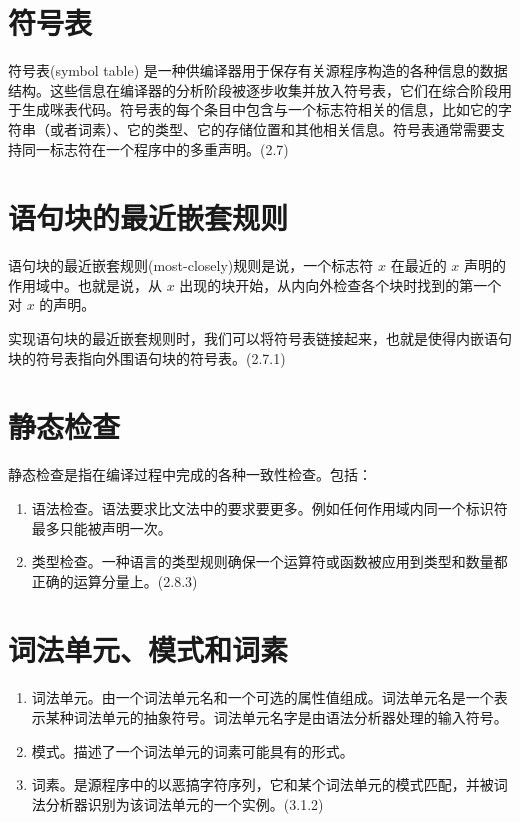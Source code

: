 \documentclass[12pt]{article}
\begin{document}
\section*{符号表}

符号表(symbol table) 是一种供编译器用于保存有关源程序构造的各种信息的数据结构。这些信息在编译器的分析阶段被逐步收集并放入符号表，它们在综合阶段用于生成咪表代码。符号表的每个条目中包含与一个标志符相关的信息，比如它的字符串（或者词素）、它的类型、它的存储位置和其他相关信息。符号表通常需要支持同一标志符在一个程序中的多重声明。(2.7)


\section*{语句块的最近嵌套规则}

语句块的最近嵌套规则(most-closely)规则是说，一个标志符 $x$ 在最近的 $x$ 声明的作用域中。也就是说，从 $x$ 出现的块开始，从内向外检查各个块时找到的第一个对 $x$ 的声明。

实现语句块的最近嵌套规则时，我们可以将符号表链接起来，也就是使得内嵌语句块的符号表指向外围语句块的符号表。(2.7.1)

\section*{静态检查}

静态检查是指在编译过程中完成的各种一致性检查。包括：
\begin{enumerate}
\item 语法检查。语法要求比文法中的要求要更多。例如任何作用域内同一个标识符最多只能被声明一次。
\item 类型检查。一种语言的类型规则确保一个运算符或函数被应用到类型和数量都正确的运算分量上。(2.8.3)
\end{enumerate}


\section*{词法单元、模式和词素}

\begin{enumerate}
\item 词法单元。由一个词法单元名和一个可选的属性值组成。词法单元名是一个表示某种词法单元的抽象符号。词法单元名字是由语法分析器处理的输入符号。
\item 模式。描述了一个词法单元的词素可能具有的形式。
\item 词素。是源程序中的以恶搞字符序列，它和某个词法单元的模式匹配，并被词法分析器识别为该词法单元的一个实例。(3.1.2)
\end{enumerate}
\end{document}
